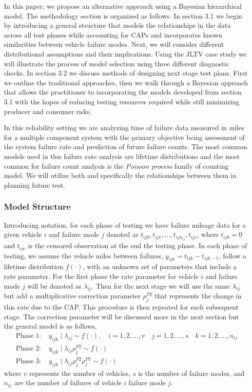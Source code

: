 \documentclass[12pt]{article}
\begin{document}
In this paper, we propose an alternative approach using a Bayesian hierarchical
model.  The methodology section is organized as follows.  In section 3.1 we
begin by introducing a general structure that models the relationships in the
data across all test phases while accounting for CAPs and incorporates known
similarities between vehicle failure modes.  Next, we will consider different
distributional assumptions and their implications.  Using the JLTV case study we
will illustrate the process of model selection using three different diagnostic
checks.  In section 3.2 we discuss methods of designing next stage test plans.
First we outline the traditional approaches, then we walk through a Bayesian
approach that allows the practitioner to incorporating the models developed from
section 3.1 with the hopes of reducing testing resources required while still
minimizing producer and consumer risks.

In this reliability setting we are analyzing time of failure data measured in
miles for a multiple component system with the primary objective being
assessment of the system failure rate and prediction of future failure counts.
The most common models used in this failure rate analysis are lifetime
distributions and the most common for failure count analysis is the
\emph{Poisson process} family of counting model.  We will utilize both and
specifically the relationships between them in planning future test.

\subsubsection{Model Structure}
Introducing notation, for each phase of testing we have failure mileage data for
a given vehicle $i$ and failure mode $j$ denoted as $t_{ij0}, t_{ij1},...,
t_{ijn_{ij}}, t_{ijc}$, where $t_{ij0} = 0$ and $t_{ijc}$ is the censored
observation at the end the testing phase. In each phase of testing, we assume
the vehicle miles between failures, $y_{ijk} = t_{ijk} - t_{ijk-1}$, follow a
lifetime distribution $f(\cdot)$, with an unknown set of parameters that include
a rate parameter.  For the first phase the rate parameter for vehicle $i$ and
failure mode $j$ will be denoted as $\lambda_{ij}$.  Then for the next stage we
will use the same $\lambda_{ij}$ but add a multiplicative correction parameter
$\rho_{j}^{P2}$ that represents the change in this rate due to the CAP.  This
procedure is then repeated for each subsequent stage.  The correction parameter
will be discussed more in the next section but the general model is as follows,
\begin{align*}
\text{Phase 1: }&y_{ijk}\mid\lambda_{ij}\sim f(\cdot), \quad i = 1,2,...,v \quad
j=1,2,...,s \quad k=1,2,...,n_{ij}\\
\text{Phase 2: }&y_{ijk}\mid\lambda_{ij}\rho_{j}^{P2}\sim f(\cdot) \\
\text{Phase 3: }&y_{ijk}\mid\lambda_{ij}\rho_{j}^{P2}\rho_{j}^{P3}\sim f(\cdot)
\end{align*}
where $v$ represents the number of vehicles, $s$ is the number of failure modes,
and $n_{ij}$ are the number of failures of vehicle $i$ failure mode $j$.
\end{document}
